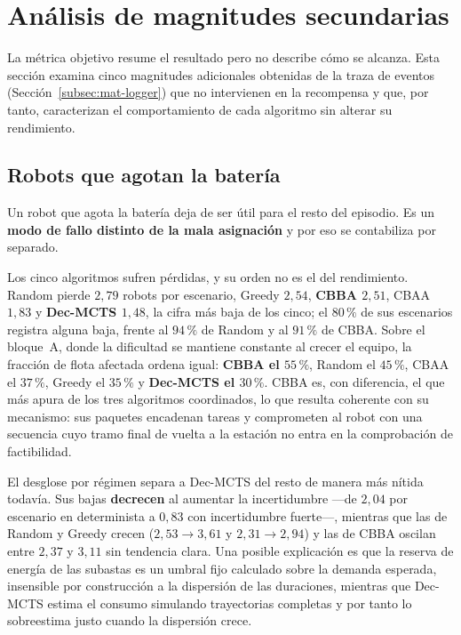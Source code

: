 \section{Análisis de magnitudes secundarias} \label{sec:exp-otras}

La métrica objetivo resume el resultado pero no describe cómo se alcanza. Esta sección examina cinco magnitudes adicionales obtenidas de la traza de eventos (Sección~\ref{subsec:mat-logger}) que no intervienen en la recompensa y que, por tanto, caracterizan el comportamiento de cada algoritmo sin alterar su rendimiento.

\subsection{Robots que agotan la batería} \label{subsec:exp-mortalidad} 

Un robot que agota la batería deja de ser útil para el resto del episodio. Es un \textbf{modo de fallo distinto de la mala asignación} y por eso se contabiliza por separado.

Los cinco algoritmos sufren pérdidas, y su orden no es el del rendimiento. Random pierde $2{,}79$ robots por escenario, Greedy $2{,}54$, \textbf{CBBA $2{,}51$}, CBAA $1{,}83$ y \textbf{Dec-MCTS $1{,}48$}, la cifra más baja de los cinco; el $80\,\text{\%}$ de sus escenarios registra alguna baja, frente al $94\,\text{\%}$ de Random y al $91\,\text{\%}$ de CBBA. Sobre el bloque~A, donde la dificultad se mantiene constante al crecer el equipo, la fracción de flota afectada ordena igual: \textbf{CBBA el $55\,\text{\%}$}, Random el $45\,\text{\%}$, CBAA el $37\,\text{\%}$, Greedy el $35\,\text{\%}$ y \textbf{Dec-MCTS el $30\,\text{\%}$}. CBBA es, con diferencia, el que más apura de los tres algoritmos coordinados, lo que resulta coherente con su mecanismo: sus paquetes encadenan tareas y comprometen al robot con una secuencia cuyo tramo final de vuelta a la estación no entra en la comprobación de factibilidad.

El desglose por régimen separa a Dec-MCTS del resto de manera más nítida todavía. Sus bajas \textbf{decrecen} al aumentar la incertidumbre ---de $2{,}04$ por escenario en determinista a $0{,}83$ con incertidumbre fuerte---, mientras que las de Random y Greedy crecen ($2{,}53 \to 3{,}61$ y $2{,}31 \to 2{,}94$) y las de CBBA oscilan entre $2{,}37$ y $3{,}11$ sin tendencia clara. Una posible explicación es que la reserva de energía de las subastas es un umbral fijo calculado sobre la demanda esperada, insensible por construcción a la dispersión de las duraciones, mientras que Dec-MCTS estima el consumo simulando trayectorias completas y por tanto lo sobreestima justo cuando la dispersión crece.


